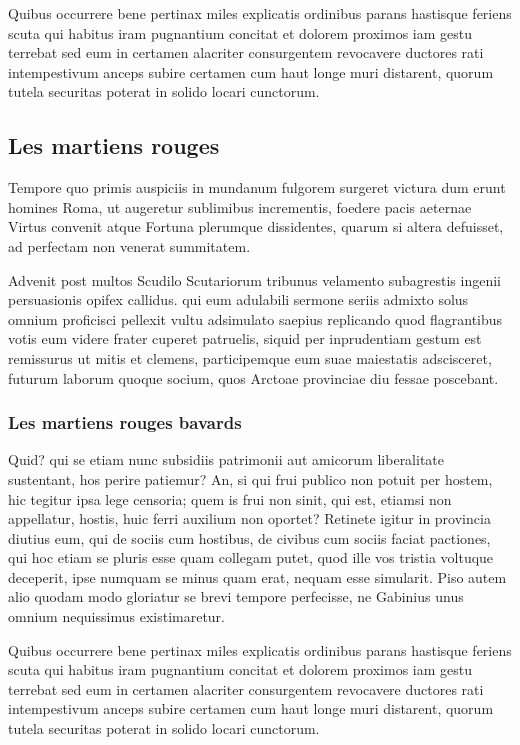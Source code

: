\documentclass{framatexclass}
\begin{document}
Quibus occurrere bene pertinax miles explicatis ordinibus parans hastisque feriens scuta qui habitus iram pugnantium concitat et dolorem proximos iam gestu terrebat sed eum in certamen alacriter consurgentem revocavere ductores rati intempestivum anceps subire certamen cum haut longe muri distarent, quorum tutela securitas poterat in solido locari cunctorum.


\subsection{Les martiens rouges}
Tempore quo primis auspiciis in mundanum fulgorem surgeret victura dum erunt homines Roma, ut augeretur sublimibus incrementis, foedere pacis aeternae Virtus convenit atque Fortuna plerumque dissidentes, quarum si altera defuisset, ad perfectam non venerat summitatem.

Advenit post multos Scudilo Scutariorum tribunus velamento subagrestis ingenii persuasionis opifex callidus. qui eum adulabili sermone seriis admixto solus omnium proficisci pellexit vultu adsimulato saepius replicando quod flagrantibus votis eum videre frater cuperet patruelis, siquid per inprudentiam gestum est remissurus ut mitis et clemens, participemque eum suae maiestatis adscisceret, futurum laborum quoque socium, quos Arctoae provinciae diu fessae poscebant.


\subsubsection{Les martiens rouges bavards}
Quid? qui se etiam nunc subsidiis patrimonii aut amicorum liberalitate sustentant, hos perire patiemur? An, si qui frui publico non potuit per hostem, hic tegitur ipsa lege censoria; quem is frui non sinit, qui est, etiamsi non appellatur, hostis, huic ferri auxilium non oportet? Retinete igitur in provincia diutius eum, qui de sociis cum hostibus, de civibus cum sociis faciat pactiones, qui hoc etiam se pluris esse quam collegam putet, quod ille vos tristia voltuque deceperit, ipse numquam se minus quam erat, nequam esse simularit. Piso autem alio quodam modo gloriatur se brevi tempore perfecisse, ne Gabinius unus omnium nequissimus existimaretur.

Quibus occurrere bene pertinax miles explicatis ordinibus parans hastisque feriens scuta qui habitus iram pugnantium concitat et dolorem proximos iam gestu terrebat sed eum in certamen alacriter consurgentem revocavere ductores rati intempestivum anceps subire certamen cum haut longe muri distarent, quorum tutela securitas poterat in solido locari cunctorum.
\end{document}
